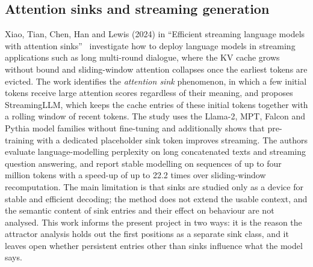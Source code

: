 \subsection{Attention sinks and streaming generation}\label{lit:sinks}
Xiao, Tian, Chen, Han and Lewis (2024) in ``Efficient streaming language models with attention sinks''~\cite{xiao2024sinks} investigate how to deploy language models in streaming applications such as long multi-round dialogue, where the KV cache grows without bound and sliding-window attention collapses once the earliest tokens are evicted. The work identifies the \emph{attention sink} phenomenon, in which a few initial tokens receive large attention scores regardless of their meaning, and proposes StreamingLLM, which keeps the cache entries of these initial tokens together with a rolling window of recent tokens. The study uses the Llama-2, MPT, Falcon and Pythia model families without fine-tuning and additionally shows that pre-training with a dedicated placeholder sink token improves streaming. The authors evaluate language-modelling perplexity on long concatenated texts and streaming question answering, and report stable modelling on sequences of up to four million tokens with a speed-up of up to 22.2 times over sliding-window recomputation. The main limitation is that sinks are studied only as a device for stable and efficient decoding; the method does not extend the usable context, and the semantic content of sink entries and their effect on behaviour are not analysed. This work informs the present project in two ways: it is the reason the attractor analysis holds out the first positions as a separate sink class, and it leaves open whether persistent entries other than sinks influence what the model says.

